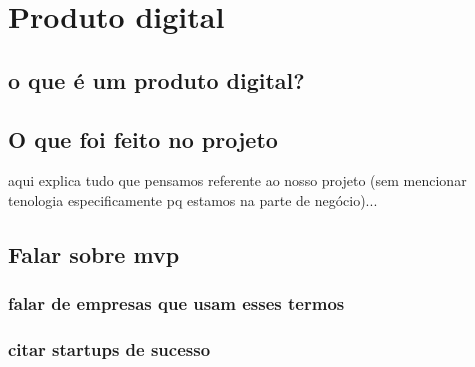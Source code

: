 \chapter{Produto digital}

\section{o que é um produto digital?}

\section{O que foi feito no projeto}

aqui explica tudo que pensamos referente ao nosso projeto (sem mencionar tenologia especificamente pq estamos na parte de negócio)...

\section{Falar sobre mvp}

\subsection{falar de empresas que usam esses termos}

\subsection{citar startups de sucesso}
